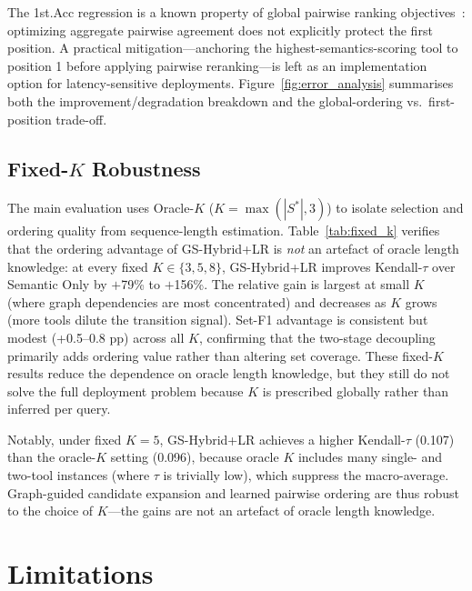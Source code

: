 \documentclass[lettersize,journal]{IEEEtran}
\begin{document}
The 1st.Acc regression is a known property of global pairwise ranking objectives~\cite{ranknet}: optimizing aggregate pairwise agreement does not explicitly protect the first position.
A practical mitigation---anchoring the highest-semantics-scoring tool to position 1 before applying pairwise reranking---is left as an implementation option for latency-sensitive deployments.
Figure~\ref{fig:error_analysis} summarises both the improvement/degradation breakdown and the global-ordering vs.\ first-position trade-off.



\subsection{Fixed-$K$ Robustness}



The main evaluation uses Oracle-$K$ ($K = \max(|S^*|, 3)$) to isolate selection and ordering quality from sequence-length estimation.
Table~\ref{tab:fixed_k} verifies that the ordering advantage of GS-Hybrid+LR is \emph{not} an artefact of oracle length knowledge: at every fixed $K \in \{3, 5, 8\}$, GS-Hybrid+LR improves Kendall-$\tau$ over Semantic Only by $+$79\% to $+$156\%.
The relative gain is largest at small $K$ (where graph dependencies are most concentrated) and decreases as $K$ grows (more tools dilute the transition signal).
Set-F1 advantage is consistent but modest (+0.5--0.8 pp) across all $K$, confirming that the two-stage decoupling primarily adds ordering value rather than altering set coverage.
These fixed-$K$ results reduce the dependence on oracle length knowledge, but they still do not solve the full deployment problem because $K$ is prescribed globally rather than inferred per query.

Notably, under fixed $K=5$, GS-Hybrid+LR achieves a higher Kendall-$\tau$ (0.107) than the oracle-$K$ setting (0.096), because oracle $K$ includes many single- and two-tool instances (where $\tau$ is trivially low), which suppress the macro-average.
Graph-guided candidate expansion and learned pairwise ordering are thus robust to the choice of $K$---the gains are not an artefact of oracle length knowledge.

\section{Limitations}
\label{sec:limitations}
\end{document}
